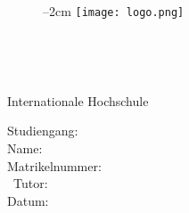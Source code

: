 \begin{titlepage}
    \begin{figure}[h]
        \centering
        \advance\leftskip--2cm
        \texttt{[image: logo.png]}
    \end{figure}
    
    \vspace{5cm}

    \begin{center}
        \begin{Large}
            \paperType\
        \end{Large}

        \begin{large}
            \paperCourse\ \\
        \end{large}
    
        \vspace{1cm}

        \begin{large}
            Internationale Hochschule
        \end{large}
    \end{center}

    \vspace*{\fill}

    \begin{large}
        \noindent Studiengang:\tabto{4cm} \textbf{\degreeProgram} \\
        Name:\tabto{4cm} \textbf{\@author} \\
        Matrikelnummer:\tabto{4cm} \textbf{\studentNumber} \\
        \ifdefined\tutorName\
        Tutor:\tabto{4cm} \textbf{\tutorName} \\
        \else
        \fi
        Datum:\tabto{4cm} \textbf{\@date}
    \end{large}
 \end{titlepage}